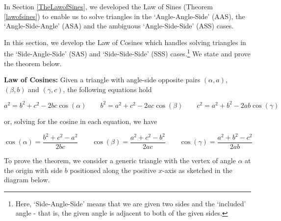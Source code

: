 \documentclass{ximera}
\begin{document}
	\author{Stitz-Zeager}




\setcounter{footnote}{0}

\label{TheLawofCosines}


In Section \ref{TheLawofSines}, we developed the Law of Sines (Theorem \ref{lawofsines}) to enable us to solve triangles in the `Angle-Angle-Side' (AAS), the `Angle-Side-Angle' (ASA) and the ambiguous `Angle-Side-Side' (ASS) cases.  

 

In this section, we develop the Law of Cosines which handles solving triangles in the  `Side-Angle-Side' (SAS) and  `Side-Side-Side' (SSS) cases.\footnote{Here, `Side-Angle-Side' means that we are given two sides and the `included' angle - that is, the given angle is adjacent to both of the given sides.}  We state and prove the theorem below.

 


\begin{theorem} \label{lawofcosines}  \textbf{Law of Cosines:}   Given a triangle with angle-side opposite pairs $(\alpha, a)$, $(\beta, b)$ and $(\gamma, c)$, the following equations hold

\[ a^2 = b^2 + c^2 - 2bc \cos(\alpha) \qquad  b^2 = a^2 + c^2 - 2ac \cos(\beta)  \qquad   c^2 = a^2 + b^2 - 2ab \cos(\gamma)  \]

or, solving for the cosine in each equation, we have
 
\[ \cos(\alpha) = \frac{b^2+c^2 - a^2}{2bc} \qquad \cos(\beta) = \frac{a^2+c^2 - b^2}{2ac} \qquad \cos(\gamma) = \frac{a^2+b^2 - c^2}{2ab} \]


 

\end{theorem}


 

To prove the theorem, we consider a generic triangle with the vertex of angle $\alpha$ at the origin with side $b$ positioned along the positive $x$-axis as sketched in the diagram below.
\end{document}
